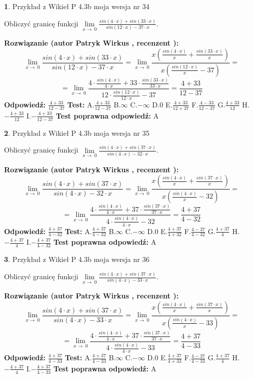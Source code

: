 \documentclass[12pt, a4paper]{article}
\theoremstyle{definition} %
\newtheorem{zad}{}
\newcommand{\zadStart}[1]{\begin{zad}#1\newline}
\newcommand{\zadStop}{\end{zad}}
\newcommand{\rozwStart}[2]{\noindent \textbf{Rozwiązanie (autor #1 , recenzent #2): }\newline}
\newcommand{\rozwStop}{\newline}
\newcommand{\odpStart}{\noindent \textbf{Odpowiedź:}\newline}
\newcommand{\odpStop}{\newline}
\newcommand{\testStart}{\noindent \textbf{Test:}\newline}
\newcommand{\testStop}{\newline}
\newcommand{\kluczStart}{\noindent \textbf{Test poprawna odpowiedź:}\newline}
\newcommand{\kluczStop}{\newline}
\begin{document}
\zadStart{Przykład z Wikieł P 4.3b moja wersja nr 34}


Obliczyć granicę funkcji $\lim\limits_{x\to\ 0}\frac{sin(4 \cdot x)+sin(33 \cdot x)}{sin(12 \cdot x)-37 \cdot x}$.
\zadStop
\rozwStart{Patryk Wirkus}{}
$$\lim\limits_{x\to\ 0}\frac{sin(4 \cdot x)+sin(33 \cdot x)}{sin(12 \cdot x)-37 \cdot x}=\lim\limits_{x\to\ 0}\frac{x(\frac{sin(4 \cdot x)}{x}+\frac{sin(33 \cdot x)}{x})}{x(\frac{sin(12 \cdot x)}{x}-37)}=$$
$$=\lim\limits_{x\to\ 0}\frac{4 \cdot \frac{sin(4 \cdot x)}{4 \cdot x}+33 \cdot \frac{sin(33 \cdot x)}{33 \cdot x}}{12 \cdot \frac{sin(12 \cdot x)}{12 \cdot x}-37}=\frac{4+33}{12-37}$$
\rozwStop
\odpStart
$\frac{4+33}{12-37}$
\odpStop
\testStart
A.$\frac{4+33}{12-37}$
B.$\infty$
C.$-\infty$
D.$0$
E.$\frac{4+33}{12+37}$
F.$\frac{4-33}{12-37}$
G.$\frac{4+33}{12}$
H.$-\frac{4+33}{12}$
I.$-\frac{4+33}{12-37}$
\testStop
\kluczStart
A
\kluczStop



\zadStart{Przykład z Wikieł P 4.3b moja wersja nr 35}


Obliczyć granicę funkcji $\lim\limits_{x\to\ 0}\frac{sin(4 \cdot x)+sin(37 \cdot x)}{sin(4 \cdot x)-32 \cdot x}$.
\zadStop
\rozwStart{Patryk Wirkus}{}
$$\lim\limits_{x\to\ 0}\frac{sin(4 \cdot x)+sin(37 \cdot x)}{sin(4 \cdot x)-32 \cdot x}=\lim\limits_{x\to\ 0}\frac{x(\frac{sin(4 \cdot x)}{x}+\frac{sin(37 \cdot x)}{x})}{x(\frac{sin(4 \cdot x)}{x}-32)}=$$
$$=\lim\limits_{x\to\ 0}\frac{4 \cdot \frac{sin(4 \cdot x)}{4 \cdot x}+37 \cdot \frac{sin(37 \cdot x)}{37 \cdot x}}{4 \cdot \frac{sin(4 \cdot x)}{4 \cdot x}-32}=\frac{4+37}{4-32}$$
\rozwStop
\odpStart
$\frac{4+37}{4-32}$
\odpStop
\testStart
A.$\frac{4+37}{4-32}$
B.$\infty$
C.$-\infty$
D.$0$
E.$\frac{4+37}{4+32}$
F.$\frac{4-37}{4-32}$
G.$\frac{4+37}{4}$
H.$-\frac{4+37}{4}$
I.$-\frac{4+37}{4-32}$
\testStop
\kluczStart
A
\kluczStop



\zadStart{Przykład z Wikieł P 4.3b moja wersja nr 36}


Obliczyć granicę funkcji $\lim\limits_{x\to\ 0}\frac{sin(4 \cdot x)+sin(37 \cdot x)}{sin(4 \cdot x)-33 \cdot x}$.
\zadStop
\rozwStart{Patryk Wirkus}{}
$$\lim\limits_{x\to\ 0}\frac{sin(4 \cdot x)+sin(37 \cdot x)}{sin(4 \cdot x)-33 \cdot x}=\lim\limits_{x\to\ 0}\frac{x(\frac{sin(4 \cdot x)}{x}+\frac{sin(37 \cdot x)}{x})}{x(\frac{sin(4 \cdot x)}{x}-33)}=$$
$$=\lim\limits_{x\to\ 0}\frac{4 \cdot \frac{sin(4 \cdot x)}{4 \cdot x}+37 \cdot \frac{sin(37 \cdot x)}{37 \cdot x}}{4 \cdot \frac{sin(4 \cdot x)}{4 \cdot x}-33}=\frac{4+37}{4-33}$$
\rozwStop
\odpStart
$\frac{4+37}{4-33}$
\odpStop
\testStart
A.$\frac{4+37}{4-33}$
B.$\infty$
C.$-\infty$
D.$0$
E.$\frac{4+37}{4+33}$
F.$\frac{4-37}{4-33}$
G.$\frac{4+37}{4}$
H.$-\frac{4+37}{4}$
I.$-\frac{4+37}{4-33}$
\testStop
\kluczStart
A
\kluczStop
\end{document}
